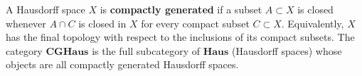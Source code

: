 A Hausdorff space $X$ is \textbf{compactly generated} if a subset $A \subset X$ is closed whenever $A \cap C$ is closed in $X$ for every compact subset $C \subset X$. Equivalently, $X$ has the final topology with respect to the inclusions of its compact subsets. The category $\mathbf{CGHaus}$ is the full subcategory of $\mathbf{Haus}$ (Hausdorff spaces) whose objects are all compactly generated Hausdorff spaces.
